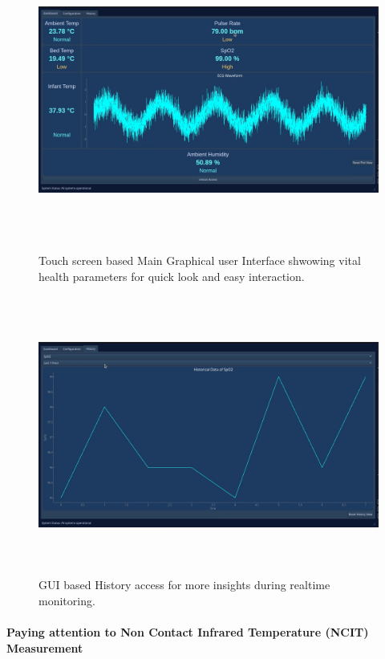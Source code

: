 \documentclass{article}
\begin{document}
\begin{figure}
  \centering
  \includegraphics[width=450pt,height=280pt]{images/ui1.png} %
  \caption{Touch screen based Main Graphical user Interface shwowing vital health parameters for quick look and easy interaction.}
  \label{fig:fig7}
\end{figure}

\begin{figure}
  \centering
  \includegraphics[width=450pt,height=260pt]{images/ui2.png} %
  \caption{GUI based History access for more insights during realtime monitoring.}
  \label{fig:fig8}
\end{figure}

\paragraph{Paying attention to Non Contact Infrared Temperature (NCIT)
Measurement}\label{paying-attention-to-non-contact-infrared-temperature-ncit-measurement}
\end{document}
